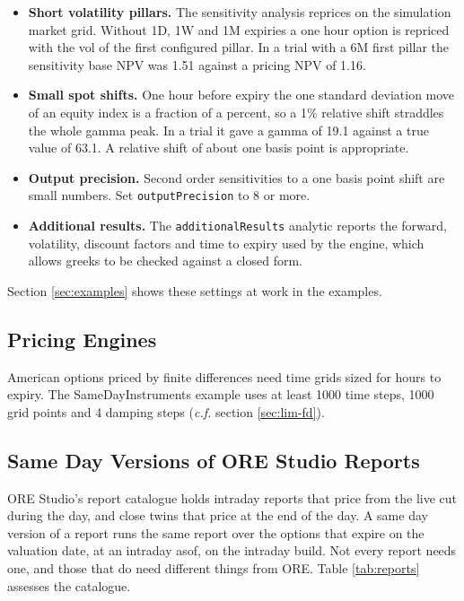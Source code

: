 \documentclass[12pt, a4paper]{article}
\begin{document}
\begin{itemize}
\item \textbf{Short volatility pillars.} The sensitivity analysis reprices on the simulation market grid. Without 1D,
  1W and 1M expiries a one hour option is repriced with the vol of the first configured pillar. In a trial with a 6M
  first pillar the sensitivity base NPV was 1.51 against a pricing NPV of 1.16.
\item \textbf{Small spot shifts.} One hour before expiry the one standard deviation move of an equity index is a
  fraction of a percent, so a 1\% relative shift straddles the whole gamma peak. In a trial it gave a gamma of 19.1
  against a true value of 63.1. A relative shift of about one basis point is appropriate.
\item \textbf{Output precision.} Second order sensitivities to a one basis point shift are small numbers. Set
  \texttt{outputPrecision} to 8 or more.
\item \textbf{Additional results.} The \texttt{additionalResults} analytic reports the forward, volatility, discount
  factors and time to expiry used by the engine, which allows greeks to be checked against a closed form.
\end{itemize}

Section \ref{sec:examples} shows these settings at work in the examples.

\subsection{Pricing Engines}

American options priced by finite differences need time grids sized for hours to expiry. The SameDayInstruments
example uses at least 1000 time steps, 1000 grid points and 4 damping steps (\textit{c.f.} section \ref{sec:lim-fd}).

\subsection{Same Day Versions of ORE Studio Reports}\label{sec:reports}

ORE Studio's report catalogue \cite{orestudio} holds intraday reports that price from the live cut during the day, and
close twins that price at the end of the day. A same day version of a report runs the same report over the options
that expire on the valuation date, at an intraday asof, on the intraday build. Not every report needs one, and those
that do need different things from ORE. Table \ref{tab:reports} assesses the catalogue.
\end{document}
